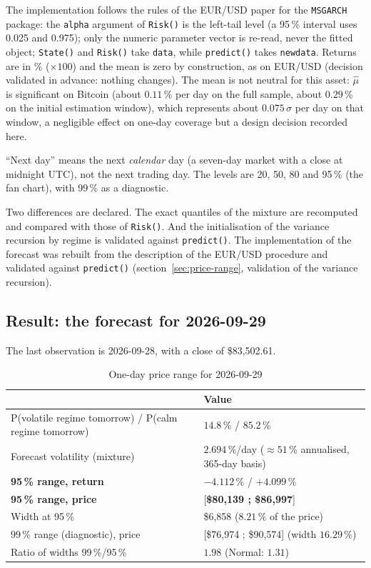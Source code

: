 \documentclass[12pt,a4paper]{article}
\begin{document}
The implementation follows the rules of the EUR/USD paper for the \texttt{MSGARCH} package: the \texttt{alpha} argument of \texttt{Risk()} is the left-tail level (a 95\,\% interval uses 0.025 and 0.975); only the numeric parameter vector is re-read, never the fitted object; \texttt{State()} and \texttt{Risk()} take \texttt{data}, while \texttt{predict()} takes \texttt{newdata}. Returns are in \% ($\times100$) and the mean is zero by construction, as on EUR/USD (decision validated in advance: nothing changes). The mean is not neutral for this asset: $\hat\mu$ is significant on Bitcoin (about $0.11\,\%$ per day on the full sample, about $0.29\,\%$ on the initial estimation window), which represents about $0.075\,\sigma$ per day on that window, a negligible effect on one-day coverage but a design decision recorded here.

``Next day'' means the next \emph{calendar} day (a seven-day market with a close at midnight UTC), not the next trading day. The levels are 20, 50, 80 and 95\,\% (the fan chart), with 99\,\% as a diagnostic.

Two differences are declared. The exact quantiles of the mixture are recomputed and compared with those of \texttt{Risk()}. And the initialisation of the variance recursion by regime is validated against \texttt{predict()}. The implementation of the forecast was rebuilt from the description of the EUR/USD procedure and validated against \texttt{predict()} (section~\ref{sec:price-range}, validation of the variance recursion).

\subsection{Result: the forecast for 2026-09-29}

The last observation is 2026-09-28, with a close of \$83,502.61.

\begin{table}[H]
	\centering
	\caption{One-day price range for 2026-09-29}
	\label{tab:range-result}
	\small
	\begin{tabular}{p{6.2cm}p{6.4cm}}
		\toprule
		& Value \\
		\midrule
		P(volatile regime tomorrow) / P(calm regime tomorrow) & $14.8\,\%$ / $85.2\,\%$ \\
		Forecast volatility (mixture) & $2.694\,\%$/day ($\approx 51\,\%$ annualised, 365-day basis) \\
		\textbf{95\,\% range, return} & $-4.112\,\%$ / $+4.099\,\%$ \\
		\textbf{95\,\% range, price} & [\textbf{\$80,139 ; \$86,997}] \\
		Width at 95\,\% & \$6,858 ($8.21\,\%$ of the price) \\
		99\,\% range (diagnostic), price & [\$76,974 ; \$90,574] (width $16.29\,\%$) \\
		Ratio of widths 99\,\%/95\,\% & $1.98$ (Normal: $1.31$) \\
		\bottomrule
	\end{tabular}
\end{table}
\end{document}

